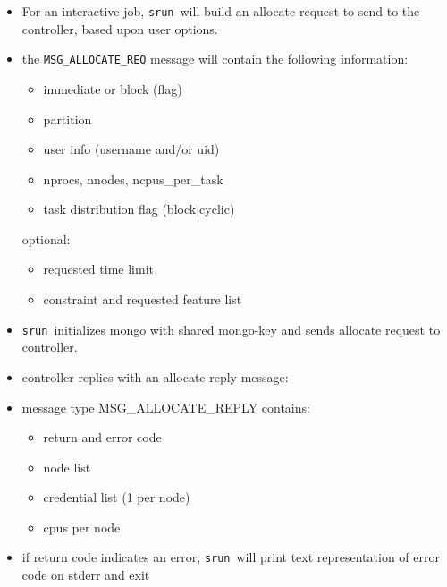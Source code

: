 \documentclass[article,letter,landscape]{seminar}
\newcommand{\srun}{{\tt srun}}
\begin{document}
\begin{slide}
  \begin{center}
  \begin{itemize}
  \item For an interactive job, \srun\ will build an allocate request
        to send to the controller, based upon user options.
  \item the {\tt MSG\_ALLOCATE\_REQ} message will contain the
        following information:
  \begin{itemize}
    \item immediate or block (flag)
    \item partition
    \item user info (username and/or uid)
    \item nprocs, nnodes, ncpus\_per\_task
    \item task distribution flag (block$|$cyclic)
  \end{itemize}
    optional:
  \begin{itemize}
    \item requested time limit
    \item constraint and requested feature list
  \end{itemize}
  \end{itemize}
  \end{center}
\end{slide}

\begin{slide}
  \begin{center}
  \begin{itemize}
  \item \srun\ initializes mongo with shared mongo-key and
        sends allocate request to controller.
  \item controller replies with an allocate reply message:
  \item message type MSG\_ALLOCATE\_REPLY contains:
  \begin{itemize}
    \item return and error code
    \item node list
    \item credential list (1 per node)
    \item cpus per node
  \end{itemize}
  \item if return code indicates an error, \srun\ will print
        text representation of error code on stderr and exit
  \end{itemize}
  \end{center}
\end{slide}
\end{document}

